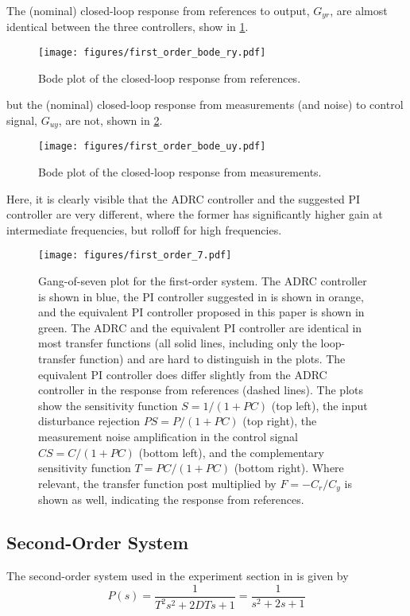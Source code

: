 \documentclass[letterpaper, 10 pt, conference]{ieeeconf}
\begin{document}
The (nominal) closed-loop response from references to output, $G_{yr}$, are almost identical between the three controllers, show in \cref{fig:first_order_bode_ry}.
\begin{figure}[h]
	\centering
	\texttt{[image: figures/first\_order\_bode\_ry.pdf]}
	\caption{Bode plot of the closed-loop response from references.}
	\label{fig:first_order_bode_ry}
\end{figure}

but the (nominal) closed-loop response from measurements (and noise) to control signal, $G_{uy}$, are not, shown in \cref{fig:first_order_bode_uy}.
\begin{figure}[h]
	\centering
	\texttt{[image: figures/first\_order\_bode\_uy.pdf]}
	\caption{Bode plot of the closed-loop response from measurements.}
	\label{fig:first_order_bode_uy}
\end{figure}
Here, it is clearly visible that the ADRC controller and the suggested PI controller are very different, where the former has significantly higher gain at intermediate frequencies, but rolloff for high frequencies.


\begin{figure*}%
	\centering
	\texttt{[image: figures/first\_order\_7.pdf]}
	\caption{Gang-of-seven plot for the first-order system. The ADRC controller is shown in blue, the PI controller suggested in \cite{herbst2013simulative} is shown in orange, and the equivalent PI controller proposed in this paper is shown in green. The ADRC and the equivalent PI controller are identical in most transfer functions (all solid lines, including only the loop-transfer function) and are hard to distinguish in the plots. The equivalent PI controller does differ slightly from the ADRC controller in the response from references (dashed lines). The plots show the sensitivity function $S = 1/(1+PC)$ (top left), the input disturbance rejection $PS = P/(1+PC)$ (top right), the measurement noise amplification in the control signal $CS = C/(1+PC)$ (bottom left), and the complementary sensitivity function $T = PC/(1+PC)$ (bottom right). Where relevant, the transfer function post multiplied by $F = -C_r / C_y$ is shown as well, indicating the response from references.}
	\label{fig:first_order_7}
\end{figure*}

\subsection{Second-Order System}
The second-order system used in the experiment section in \cite{herbst2013simulative} is given by
$$P(s) = \dfrac{1}{T^2s^2 + 2DTs + 1} = \dfrac{1}{s^2 + 2s + 1}$$
\end{document}
